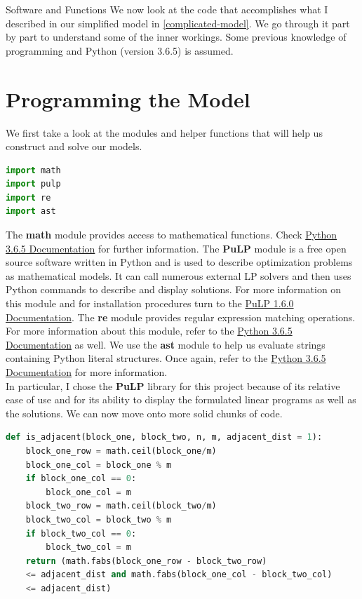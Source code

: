 \documentclass[12pt]{pom_thesis}
\theoremstyle{definition}
\begin{document}
%
%
%
%
\begin{chapter}{Software and Functions}
We now look at the code that accomplishes what I described in our simplified model in \autoref{complicated-model}. We go through it part by part to understand some of the inner workings. Some previous knowledge of programming and Python (version 3.6.5) is assumed. 

%
%
\section{Programming the Model}
We first take a look at the modules and helper functions that will help us construct and solve our models. \\
\begin{lstlisting}[language = Python, caption = Utilized Python Modules]
import math
import pulp
import re
import ast
\end{lstlisting}
The \textbf{math} module provides access to mathematical functions. Check \href{https://docs.python.org/3/library/math.html}{Python 3.6.5 Documentation} for further information. The \textbf{PuLP} module is a free open source software written in Python and is used to describe optimization problems as mathematical models. It can call numerous external LP solvers and then uses Python commands to describe and display solutions. For more information on this module and for installation procedures turn to the \href{https://pythonhosted.org/PuLP/}{PuLP 1.6.0 Documentation}. The \textbf{re} module provides regular expression matching operations. For more information about this module, refer to the \href{https://docs.python.org/3/library/re.html}{Python 3.6.5 Documentation} as well. We use the \textbf{ast} module to help us evaluate strings containing Python literal structures. Once again, refer to the \href{https://docs.python.org/3/library/ast.html}{Python 3.6.5 Documentation} for more information.\\
In particular, I chose the \textbf{PuLP} library for this project because of its relative ease of use and for its ability to display the formulated linear programs as well as the solutions. We can now move onto more solid chunks of code.\\
\begin{lstlisting}[language = Python, caption = Tells us if two blocks are bordering each other (a proxy for the service area measurement)., xleftmargin = -40pt]
def is_adjacent(block_one, block_two, n, m, adjacent_dist = 1):
	block_one_row = math.ceil(block_one/m)
	block_one_col = block_one % m
	if block_one_col == 0:
		block_one_col = m
	block_two_row = math.ceil(block_two/m)
	block_two_col = block_two % m
	if block_two_col == 0:
		block_two_col = m
	return (math.fabs(block_one_row - block_two_row) 
	<= adjacent_dist and math.fabs(block_one_col - block_two_col) 
	<= adjacent_dist)
	

\end{lstlisting}
\end{chapter}
\end{document}

